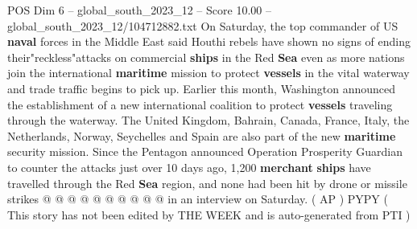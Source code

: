 \begin{textsample}{POS Dim 6 – global\_south\_2023\_12 – Score 10.00 – global\_south\_2023\_12/104712882.txt}
On Saturday, the top commander of US \textbf{naval} forces in the Middle East said Houthi rebels have shown no signs of ending their"reckless"attacks on commercial \textbf{ships} in the Red \textbf{Sea} even as more nations join the international \textbf{maritime} mission to protect \textbf{vessels} in the vital waterway and trade traffic begins to pick up.
Earlier this month, Washington announced the establishment of a new international coalition to protect \textbf{vessels} traveling through the waterway.
The United Kingdom, Bahrain, Canada, France, Italy, the Netherlands, Norway, Seychelles and Spain are also part of the new \textbf{maritime} security mission.
Since the Pentagon announced Operation Prosperity Guardian to counter the attacks just over 10 days ago, 1,200 \textbf{merchant} \textbf{ships} have travelled through the Red \textbf{Sea} region, and none had been hit by drone or missile strikes @ @ @ @ @ @ @ @ @ @ in an interview on Saturday. ( AP ) PYPY ( This story has not been edited by THE WEEK and is auto-generated from PTI )

\end{textsample}
